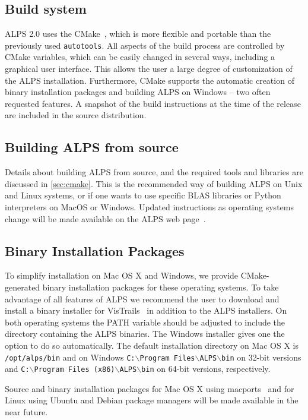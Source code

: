 \documentclass[12pt]{iopart}
\begin{document}
\subsection{Build system}
ALPS 2.0 uses the CMake~\cite{cmake}, which is more flexible and portable than the previously used {\tt autotools}. All aspects of the build process are controlled by CMake variables, which can be easily changed in several ways, including a graphical user interface. This allows the user a large degree of customization of the ALPS installation. Furthermore, CMake supports the automatic creation of binary installation packages and building ALPS on Windows -- two often requested features. A snapshot of the build instructions at the time of the release are included in the source distribution. 
\subsection{Building ALPS from source}

Details about building ALPS from source, and the required tools and libraries are discussed in \ref{sec:cmake}. This is the recommended way of building ALPS on Unix and Linux systems, or if one wants to use specific BLAS libraries or Python interpreters on MacOS or Windows. Updated instructions as operating systems change will be made available on the ALPS web page~\cite{alps}.

\subsection{Binary Installation Packages}

To simplify installation on Mac OS X and Windows, we provide CMake-generated binary installation packages for these operating systems. To take advantage of all features of ALPS we recommend the user to download and install a binary installer for VisTrails~\cite{vistrails} in addition to the ALPS installers. On both operating systems the PATH variable should be adjusted to include the directory containing the ALPS binaries. The Windows installer gives one the option to do so automatically. The default installation directory on Mac OS X is {\tt /opt/alps/bin} and on Windows {\tt C:$\backslash$Program Files$\backslash$ALPS$\backslash$bin} on 32-bit versions and {\tt C:$\backslash$Program Files (x86)$\backslash$ALPS$\backslash$bin} on 64-bit versions, respectively.

Source and binary installation packages for Mac OS X using macports~\cite{macports} and for Linux using Ubuntu and Debian package managers will be made available in the near future.
\end{document}
